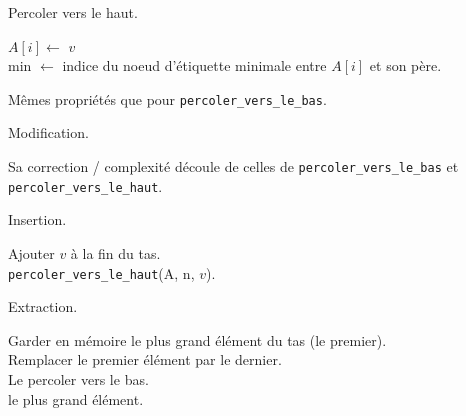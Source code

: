 \documentclass[french, 11pt]{article}
\begin{document}
\begin{defi}{Percoler vers le haut.}{}
    \hspace*{0.2cm}\begin{algorithm}[H]
        \LinesNumbered
        \caption{Percoler vers le haut}
        $A[i] \gets$ $v$\\
        min $\gets$ indice du noeud d'étiquette minimale entre $A[i]$ et son père.\\
    \end{algorithm}
    Mêmes propriétés que pour \texttt{percoler\_vers\_le\_bas}.
\end{defi}

\begin{defi}{Modification.}{}
    \hspace*{0.2cm}\begin{algorithm}[H]
        \LinesNumbered
        \caption{Modification}
    \end{algorithm}
    Sa correction / complexité découle de celles de \texttt{percoler\_vers\_le\_bas} et \texttt{percoler\_vers\_le\_haut}.
\end{defi}

\begin{defi}{Insertion.}{}
    \hspace*{0.2cm}\begin{algorithm}[H]
        \LinesNumbered
        \caption{Insertion}
        Ajouter $v$ à la fin du tas.\\
        \texttt{percoler\_vers\_le\_haut}(A, n, $v$).
    \end{algorithm}
\end{defi}

\begin{defi}{Extraction.}{}
    \hspace*{0.2cm}\begin{algorithm}[H]
        \LinesNumbered
        \caption{Extraction}
        Garder en mémoire le plus grand élément du tas (le premier).\\
        Remplacer le premier élément par le dernier.\\
        Le percoler vers le bas.\\
        \Retour le plus grand élément.
    \end{algorithm}
\end{defi}
\end{document}
